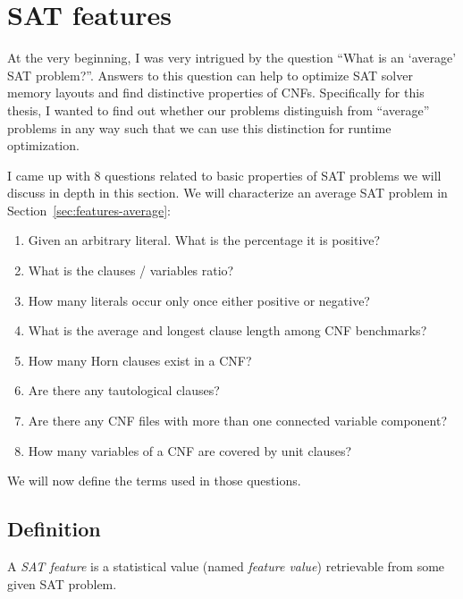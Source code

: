 \renewcommand*\chappic{img/satfeatures-bw.pdf}
\renewcommand*\chapquote{To be usable effectively [\dots] these features must be related to instance hardness and relatively cheap to compute}
\renewcommand*\chapquotesrc{SATzilla}
\chapter{SAT features}
\label{ch:features}
%
At the very beginning, I was very intrigued by the question
\enquote{What is an \enquote{average} SAT problem?}. Answers to this
question can help to optimize SAT solver memory layouts and
find distinctive properties of CNFs.
Specifically for this thesis, I wanted to find out whether
our problems distinguish from \enquote{average} problems in any
way such that we can use this distinction for runtime optimization.

I came up with 8 questions related to basic properties of SAT problems
we will discuss in depth in this section. We will characterize an
average SAT problem in Section~\ref{sec:features-average}:
\begin{enumerate}
\item Given an arbitrary literal. What is the percentage it is positive?
\item What is the clauses / variables ratio?
\item How many literals occur only once either positive or negative?
\item What is the average and longest clause length among CNF benchmarks?
\item How many Horn clauses exist in a CNF?
\item Are there any tautological clauses?
\item Are there any CNF files with more than one connected variable component?
\item How many variables of a CNF are covered by unit clauses?
\end{enumerate}

We will now define the terms used in those questions.

\section{Definition}
\label{sec:features-definition}
%
\begin{defi}
  A \emph{SAT feature} is a statistical value (named \emph{feature value})
  retrievable from some given SAT problem.
\end{defi}

